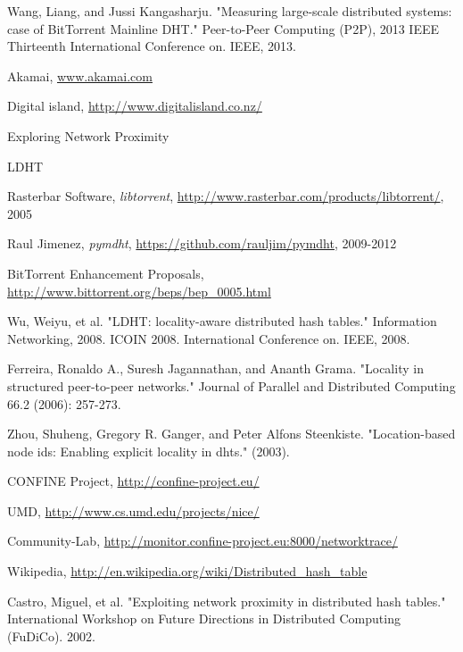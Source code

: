 \documentclass[conference]{IEEEtran}
\begin{document}
%
%
%
\begin{thebibliography}{1}


Wang, Liang, and Jussi Kangasharju. "Measuring large-scale distributed systems: case of BitTorrent Mainline DHT." Peer-to-Peer Computing (P2P), 2013 IEEE Thirteenth International Conference on. IEEE, 2013.

Akamai, \url{www.akamai.com}

Digital island, \url{http://www.digitalisland.co.nz/}

Exploring Network Proximity

LDHT

Rasterbar Software, \emph{libtorrent}, \url{http://www.rasterbar.com/products/libtorrent/}, 2005

Raul Jimenez, \emph{pymdht}, \url{https://github.com/rauljim/pymdht}, 2009-2012

BitTorrent Enhancement Proposals, \url{http://www.bittorrent.org/beps/bep_0005.html}

Wu, Weiyu, et al. "LDHT: locality-aware distributed hash tables." Information Networking, 2008. ICOIN 2008. International Conference on. IEEE, 2008.

Ferreira, Ronaldo A., Suresh Jagannathan, and Ananth Grama. "Locality in structured peer-to-peer networks." Journal of Parallel and Distributed Computing 66.2 (2006): 257-273.

Zhou, Shuheng, Gregory R. Ganger, and Peter Alfons Steenkiste. "Location-based node ids: Enabling explicit locality in dhts." (2003).

CONFINE Project, \url{http://confine-project.eu/}

UMD, \url{http://www.cs.umd.edu/projects/nice/}

Community-Lab, \url{http://monitor.confine-project.eu:8000/networktrace/}

Wikipedia, \url{http://en.wikipedia.org/wiki/Distributed_hash_table}

Castro, Miguel, et al. "Exploiting network proximity in distributed hash tables." International Workshop on Future Directions in Distributed Computing (FuDiCo). 2002.

\end{thebibliography}
\end{document}
